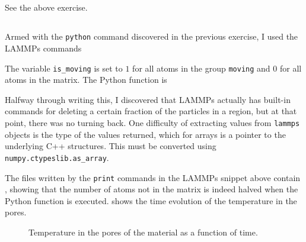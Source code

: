 \documentclass[11pt,british,a4paper]{report}
\begin{document}
\subsection{}
See the above exercise.

\subsection{}\label{subsec:e}
Armed with the \texttt{python} command discovered in the previous exercise, I used the LAMMPs commands

The variable \texttt{is\_moving} is set to \(1\) for all atoms in the group \texttt{moving} and \(0\) for all atoms in the matrix. The Python function is

Halfway through writing this, I discovered that LAMMPs actually has built-in commands for deleting a certain fraction of the particles in a region, but at that point, there was no turning back. One difficulty of extracting values from \texttt{lammps} objects is the type of the values returned, which for arrays is a pointer to the underlying C++ structures. This must be converted using \texttt{numpy.ctypeslib.as\_array}.

The files written by the \texttt{print} commands in the LAMMPs snippet above contain , showing that the number of atoms not in the matrix is indeed halved when the Python function is executed.  shows the time evolution of the temperature in the pores.

\begin{figure}[tbh]
    \centering
    \caption{Temperature in the pores of the material as a function of time.}%
    \label{fig:temppores}
\end{figure}
\end{document}
